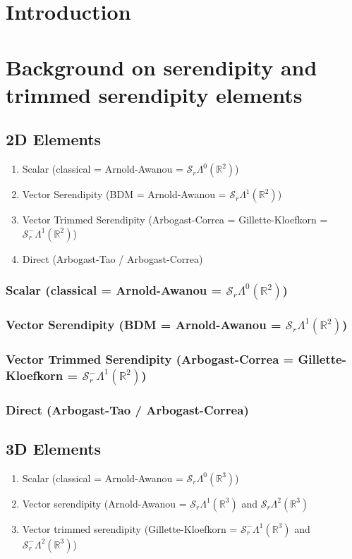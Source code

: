 \documentclass[manuscript,screen]{acmart}
\newcommand{\R}{\mathbb{R}}
\newcommand{\calS}{\mathcal{S}}
\begin{document}
  
  \section{Introduction}
  
  \section{Background on serendipity and trimmed serendipity elements}
  
  \subsection{2D Elements}
  \begin{enumerate}
  \item Scalar (classical = Arnold-Awanou = $\calS_r\Lambda^0(\R^2)$)
  \item Vector Serendipity (BDM = Arnold-Awanou = $\calS_r\Lambda^1(\R^2)$)
  \item Vector Trimmed Serendipity (Arbogast-Correa = Gillette-Kloefkorn = $\calS_r^-\Lambda^1(\R^2)$)
  \item Direct (Arbogast-Tao / Arbogast-Correa)
  \end{enumerate}
  
  
  \subsubsection{Scalar (classical = Arnold-Awanou = $\calS_r\Lambda^0(\R^2)$)}
  
  \subsubsection{Vector Serendipity (BDM = Arnold-Awanou = $\calS_r\Lambda^1(\R^2)$)}
  
  \subsubsection{Vector Trimmed Serendipity (Arbogast-Correa = Gillette-Kloefkorn = $\calS_r^-\Lambda^1(\R^2)$)}
  
  \subsubsection{Direct (Arbogast-Tao / Arbogast-Correa)}
  
  \subsection{3D Elements}
  \begin{enumerate}
  \item Scalar (classical = Arnold-Awanou = $\calS_r\Lambda^0(\R^3)$)
  \item Vector serendipity (Arnold-Awanou = $\calS_r\Lambda^1(\R^3)$ and $\calS_r\Lambda^2(\R^3)$
  \item Vector trimmed serendipity (Gillette-Kloefkorn = $\calS_r^-\Lambda^1(\R^3)$ and $\calS_r^-\Lambda^2(\R^3)$)
  
  \end{enumerate}
  
\end{document}
